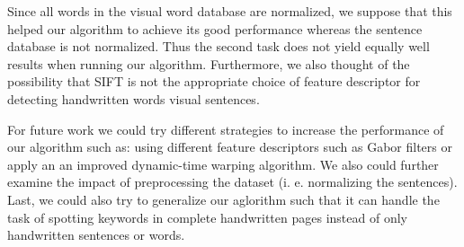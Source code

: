 \documentclass[conference]{IEEEtran}
\begin{document}
Since all words in the visual word database are normalized, we suppose that this helped our algorithm to achieve its good performance whereas the sentence database is not normalized. Thus the second task does not yield equally well results when running our algorithm. Furthermore, we also thought of the possibility that SIFT is not the appropriate choice of feature descriptor for detecting handwritten words visual sentences. 

For future work we could try different strategies to increase the performance of our algorithm such as: using different feature descriptors such as Gabor filters or apply an an improved dynamic-time warping algorithm. 
We also could further examine the impact of preprocessing the dataset (i. e. normalizing the sentences). 
Last, we could also try to generalize our aglorithm such that it can handle the task of spotting keywords in complete handwritten pages instead of only handwritten sentences or words.

%
%



%
%
\end{document}
